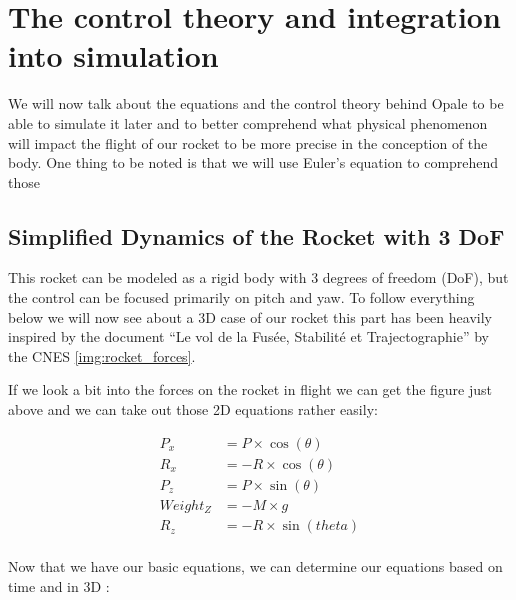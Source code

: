 \section{The control theory and integration into simulation}

We will now talk about the equations and the control theory behind Opale to be
able to simulate it later and to better comprehend what physical phenomenon
will impact the flight of our rocket to be more precise in the conception of
the body. One thing to be noted is that we will use Euler's equation to
comprehend those

\subsection{Simplified Dynamics of the Rocket with 3 DoF}


\FloatBarrier

This rocket can be modeled as a rigid body with 3 degrees of freedom (DoF), but
the control can be focused primarily on pitch and yaw. To follow everything
below we will now see about a 3D case of our rocket this part has been heavily
inspired by the document “Le vol de la Fusée, Stabilité et Trajectographie” by
the CNES \ref{img:rocket_forces}.

If we look a bit into the forces on the rocket in flight we can get the figure
just above and we can take out those 2D equations rather easily:

\begin{align*}
    P_x      & = P \times \cos({\theta})   \\
    R_x      & = - R \times \cos({\theta}) \\
    P_z      & = P \times \sin({\theta})   \\
    Weight_Z & = -M \times g               \\
    R_z      & = -R \times \sin ({theta})  \\
\end{align*}
\FloatBarrier

Now that we have our basic equations, we can determine our equations based on
time and in 3D :

